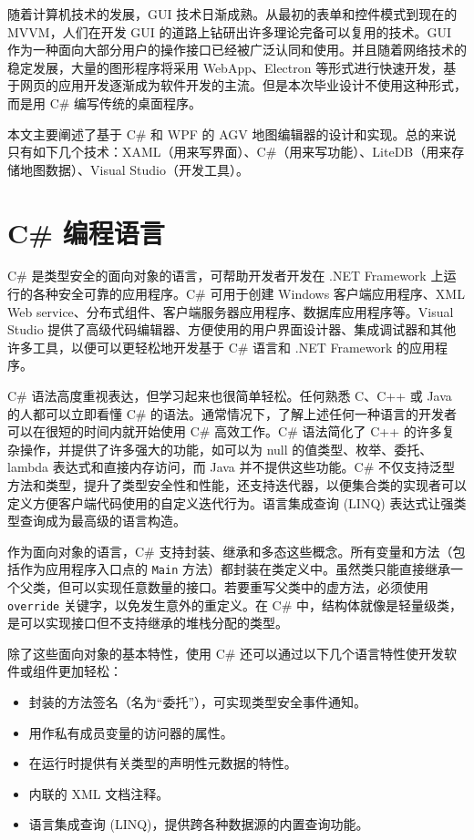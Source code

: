 
随着计算机技术的发展，GUI 技术日渐成熟。从最初的表单和控件模式到现在的 MVVM，人们在开发 GUI 的道路上钻研出许多理论完备可以复用的技术。GUI 作为一种面向大部分用户的操作接口已经被广泛认同和使用。并且随着网络技术的稳定发展，大量的图形程序将采用 WebApp、Electron 等形式进行快速开发，基于网页的应用开发逐渐成为软件开发的主流。但是本次毕业设计不使用这种形式，而是用 C\# 编写传统的桌面程序。

本文主要阐述了基于 C\# 和 WPF 的 AGV 地图编辑器的设计和实现。总的来说只有如下几个技术：XAML（用来写界面）、C\#（用来写功能）、LiteDB（用来存储地图数据）、Visual Studio（开发工具）。

\section{C\# 编程语言}

C\# 是类型安全的面向对象的语言，可帮助开发者开发在 .NET Framework 上运行的各种安全可靠的应用程序。C\# 可用于创建 Windows 客户端应用程序、XML Web service、分布式组件、客户端服务器应用程序、数据库应用程序等。Visual Studio 提供了高级代码编辑器、方便使用的用户界面设计器、集成调试器和其他许多工具，以便可以更轻松地开发基于 C\# 语言和 .NET Framework 的应用程序。

C\# 语法高度重视表达，但学习起来也很简单轻松。任何熟悉 C、C++ 或 Java 的人都可以立即看懂 C\# 的语法。通常情况下，了解上述任何一种语言的开发者可以在很短的时间内就开始使用 C\# 高效工作。C\# 语法简化了 C++ 的许多复杂操作，并提供了许多强大的功能，如可以为 null 的值类型、枚举、委托、lambda 表达式和直接内存访问，而 Java 并不提供这些功能。C\# 不仅支持泛型方法和类型，提升了类型安全性和性能，还支持迭代器，以便集合类的实现者可以定义方便客户端代码使用的自定义迭代行为。语言集成查询 (LINQ) 表达式让强类型查询成为最高级的语言构造。

作为面向对象的语言，C\# 支持封装、继承和多态这些概念。所有变量和方法（包括作为应用程序入口点的 \texttt{Main} 方法）都封装在类定义中。虽然类只能直接继承一个父类，但可以实现任意数量的接口。若要重写父类中的虚方法，必须使用 \texttt{override} 关键字，以免发生意外的重定义。在 C\# 中，结构体就像是轻量级类，是可以实现接口但不支持继承的堆栈分配的类型。

除了这些面向对象的基本特性，使用 C\# 还可以通过以下几个语言特性使开发软件或组件更加轻松：

\begin{itemize}
  \item 封装的方法签名（名为``委托''），可实现类型安全事件通知。
  \item 用作私有成员变量的访问器的属性。
  \item 在运行时提供有关类型的声明性元数据的特性。
  \item 内联的 XML 文档注释。
  \item 语言集成查询 (LINQ)，提供跨各种数据源的内置查询功能。
\end{itemize}

